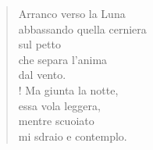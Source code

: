 
\begin{verse}
    Arranco verso la Luna\\
    abbassando quella cerniera\\
    sul petto\\
    che separa l'anima\\
    dal vento.\\!
    Ma giunta la notte,\\
    essa vola leggera,\\
    mentre scuoiato\\
    mi sdraio e contemplo.
\end{verse}